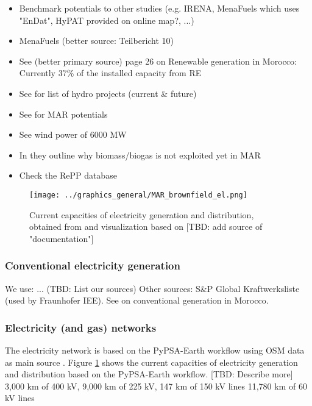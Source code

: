 \begin{itemize}
    \item Benchmark potentials to other studies (e.g. IRENA, MenaFuels which uses "EnDat", HyPAT provided on online map?, ...)
    \item MenaFuels \cite[p. 25]{Ersoy2022} (better source: Teilbericht 10)
    \item See \cite{Ersoy2022} (better primary source) page 26 on Renewable generation in Morocco: Currently 37\% of the installed capacity from RE
    \item See \cite[p. 5]{Boulakhbar2020} for list of hydro projects (current \& future)
    \item See \cite[primary 10,13,17]{Boulakhbar2020} for MAR potentials
    \item See \cite[primary 13, 38]{Boulakhbar2020} wind power of 6000 MW
    \item In \cite[p. 6]{Boulakhbar2020} they outline why biomass/biogas is not exploited yet in MAR
    \item Check the RePP database \cite{Peters2023}
\end{itemize}



\begin{figure}[h!]
    \centering
    \texttt{[image: ../graphics\_general/MAR\_brownfield\_el.png]}
    \caption{Current capacities of electricity generation and distribution, obtained from \cite{Parzen2022} and visualization based on [TBD: add source of "documentation"]}
    \label{fig:MAR_brownfield}
\end{figure}


\subsubsection{Conventional electricity generation}
We use: ... (TBD: List our sources)
Other sources: S\&P Global Kraftwerksliste (used by Fraunhofer IEE).
See \cite[p. 26]{Ersoy2022}  on conventional generation in Morocco.


\subsubsection{Electricity (and gas) networks}
The electricity network is based on the PyPSA-Earth workflow using OSM data as main source \cite{Parzen2022}. Figure \ref{fig:MAR_brownfield} shows the current capacities of electricity generation and distribution based on the PyPSA-Earth workflow. [TBD: Describe more]
3,000 km of 400 kV, 9,000 km of 225 kV, 147 km of 150 kV lines 
11,780 km of 60 kV lines \cite[p. 6, primary 44]{Boulakhbar2020}



